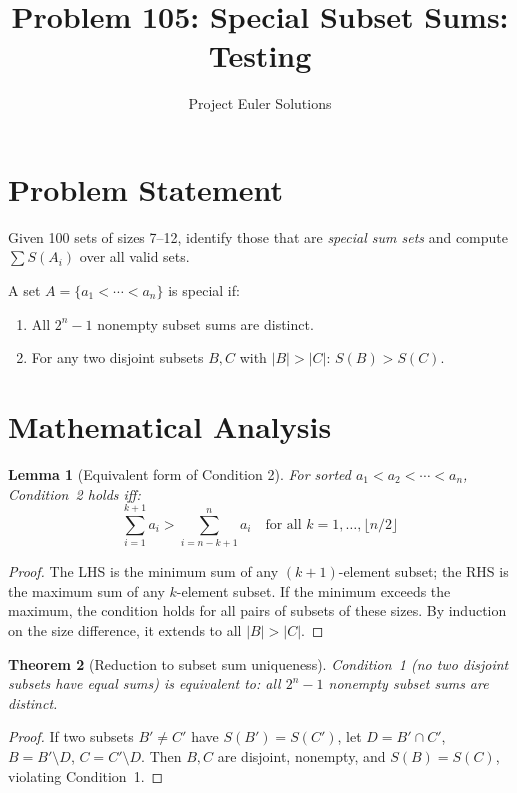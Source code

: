 \documentclass[11pt]{article}
\title{Problem 105: Special Subset Sums: Testing}
\author{Project Euler Solutions}
\date{}
\newtheorem{theorem}{Theorem}
\newtheorem{lemma}[theorem]{Lemma}
\begin{document}
\maketitle

\section{Problem Statement}
Given 100 sets of sizes 7--12, identify those that are \emph{special sum sets} and compute $\sum S(A_i)$ over all valid sets.

A set $A = \{a_1 < \cdots < a_n\}$ is special if:
\begin{enumerate}
\item All $2^n - 1$ nonempty subset sums are distinct.
\item For any two disjoint subsets $B, C$ with $|B| > |C|$: $S(B) > S(C)$.
\end{enumerate}

\section{Mathematical Analysis}

\begin{lemma}[Equivalent form of Condition 2]
For sorted $a_1 < a_2 < \cdots < a_n$, Condition~2 holds iff:
\[
\sum_{i=1}^{k+1} a_i > \sum_{i=n-k+1}^{n} a_i \quad \text{for all } k = 1, \ldots, \lfloor n/2 \rfloor
\]
\end{lemma}

\begin{proof}
The LHS is the minimum sum of any $(k+1)$-element subset; the RHS is the maximum sum of any $k$-element subset. If the minimum exceeds the maximum, the condition holds for all pairs of subsets of these sizes. By induction on the size difference, it extends to all $|B| > |C|$.
\end{proof}

\begin{theorem}[Reduction to subset sum uniqueness]
Condition~1 (no two disjoint subsets have equal sums) is equivalent to: all $2^n - 1$ nonempty subset sums are distinct.
\end{theorem}

\begin{proof}
If two subsets $B' \ne C'$ have $S(B') = S(C')$, let $D = B' \cap C'$, $B = B' \setminus D$, $C = C' \setminus D$. Then $B, C$ are disjoint, nonempty, and $S(B) = S(C)$, violating Condition~1.
\end{proof}
\end{document}
